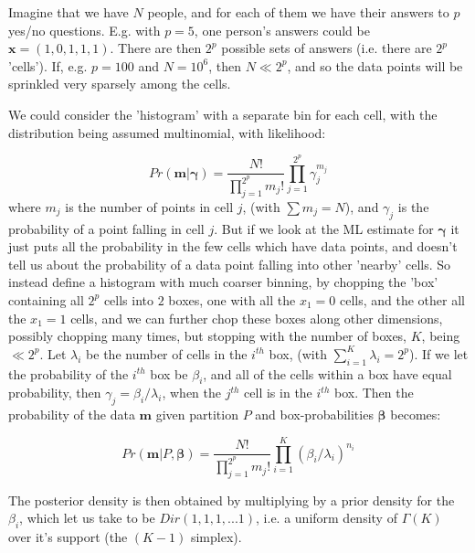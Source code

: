 \documentclass[14pt,english]{extarticle}
\begin{document}
\setlength{\unitlength}{1.4 mm}
 \pagestyle {empty} %
Imagine that we have $N$ people, and for each of them we have their answers to $p$ yes/no questions. E.g. with $p=5$, one person's answers could be $\boldsymbol{x} = (1,0,1,1,1)$. There are then $2^p$ possible sets of answers (i.e. there are $2^p$ 'cells'). If, e.g. $p=100$ and $N=10^6$, then $N \ll 2^p$, and so the data points will be sprinkled very sparsely among the cells. 

We could consider the 'histogram' with a separate bin for each cell, with the distribution being assumed multinomial, with likelihood:

$$ Pr(\boldsymbol{m} | \boldsymbol{\gamma}) =  \frac{N!}{\prod_{j=1}^{2^p}m_j!}  \prod_{j=1}^{2^p} \gamma_{j}^{m_j} $$
where $m_j$ is the number of points in cell $j$, (with $\sum m_j = N$), and $\gamma_j$ is the probability of a point falling in cell $j$. But if we look at the ML estimate for $\boldsymbol{\gamma}$ it just puts all the probability in the few cells which have data points, and doesn't tell us about the probability of a data point falling into other 'nearby' cells. 
So instead define a histogram with much coarser binning, by chopping the 'box' containing all $2^p$ cells into $2$ boxes, one with all the $x_1=0$ cells, and the other all the $x_1=1$ cells, and we can further chop these boxes along other dimensions, possibly chopping many times, but stopping with the number of boxes, $K$, being $ \ll 2^p$. Let $\lambda_i$ be the number of cells in the $i^{th}$ box, (with $\sum_{i=1}^{K}\lambda_i = 2^p$). If we let the probability of the $i^{th}$ box be $\beta_i$, and all of the cells within a box have equal probability, then $\gamma_j=\beta_i/\lambda_i$, when the $j^{th}$ cell is in the $i^{th}$ box. Then the probability of the data $\boldsymbol{m}$ given partition $P$ and box-probabilities $\boldsymbol{\beta}$ becomes:

$$ Pr(\boldsymbol{m} | P, \boldsymbol{\beta} ) =  \frac{N!}{\prod_{j=1}^{2^p}m_j!}  \prod_{i=1}^{K} ({\beta_{i}}/{\lambda_i})^{n_i} $$

The posterior density is then obtained by multiplying by a prior density for the $\beta_i$, which let us take to be $Dir(1,1,1,...1)$, i.e. a uniform density of $\Gamma(K)$ over it's support (the $(K-1)$ simplex).
\end{document}
